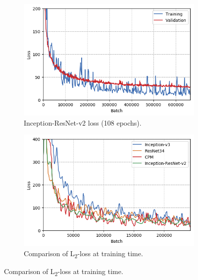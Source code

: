 \begin{figure}%
    \vspace*{-.5\baselineskip}
	\centering%
    \begin{subfigure}[t]{0.34\textwidth}
        \centering
        \includegraphics[width=\textwidth]{img/incres_all_loss}
        \vspace*{-.5\baselineskip}
        \caption{Inception-ResNet-v2 loss (108 epochs).\label{fig:best_loss}}
    \end{subfigure}%
    \enspace
    \begin{subfigure}[t]{0.34\textwidth}
    	\centering
        \includegraphics[width=\textwidth]{img/compare_train_loss}
        \vspace*{-.5\baselineskip}
        \caption{Comparison of L\textsubscript{2}-loss at training time.\label{fig:compare_train_loss}}
    \end{subfigure}%
    \enspace

\end{figure}
